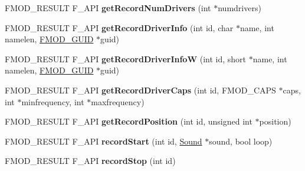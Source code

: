 \begin{DoxyCompactItemize}
\item 
\hypertarget{class_f_m_o_d_1_1_system_a0729c552a7f61ddb37a81feb1469c9e8}{F\-M\-O\-D\-\_\-\-R\-E\-S\-U\-L\-T F\-\_\-\-A\-P\-I {\bfseries get\-Record\-Num\-Drivers} (int $\ast$numdrivers)}\label{class_f_m_o_d_1_1_system_a0729c552a7f61ddb37a81feb1469c9e8}

\item 
\hypertarget{class_f_m_o_d_1_1_system_a7c9feb1180cbafcd4b7295a72b3e56ff}{F\-M\-O\-D\-\_\-\-R\-E\-S\-U\-L\-T F\-\_\-\-A\-P\-I {\bfseries get\-Record\-Driver\-Info} (int id, char $\ast$name, int namelen, \hyperlink{struct_f_m_o_d___g_u_i_d}{F\-M\-O\-D\-\_\-\-G\-U\-I\-D} $\ast$guid)}\label{class_f_m_o_d_1_1_system_a7c9feb1180cbafcd4b7295a72b3e56ff}

\item 
\hypertarget{class_f_m_o_d_1_1_system_a03e2c57a0b01c190e98f92753c606f4a}{F\-M\-O\-D\-\_\-\-R\-E\-S\-U\-L\-T F\-\_\-\-A\-P\-I {\bfseries get\-Record\-Driver\-Info\-W} (int id, short $\ast$name, int namelen, \hyperlink{struct_f_m_o_d___g_u_i_d}{F\-M\-O\-D\-\_\-\-G\-U\-I\-D} $\ast$guid)}\label{class_f_m_o_d_1_1_system_a03e2c57a0b01c190e98f92753c606f4a}

\item 
\hypertarget{class_f_m_o_d_1_1_system_ad5ee4d0a2a2b89ae66d3bbd7255e77a2}{F\-M\-O\-D\-\_\-\-R\-E\-S\-U\-L\-T F\-\_\-\-A\-P\-I {\bfseries get\-Record\-Driver\-Caps} (int id, F\-M\-O\-D\-\_\-\-C\-A\-P\-S $\ast$caps, int $\ast$minfrequency, int $\ast$maxfrequency)}\label{class_f_m_o_d_1_1_system_ad5ee4d0a2a2b89ae66d3bbd7255e77a2}

\item 
\hypertarget{class_f_m_o_d_1_1_system_a508b2368e0c8d9d7d582b89e957c5b5b}{F\-M\-O\-D\-\_\-\-R\-E\-S\-U\-L\-T F\-\_\-\-A\-P\-I {\bfseries get\-Record\-Position} (int id, unsigned int $\ast$position)}\label{class_f_m_o_d_1_1_system_a508b2368e0c8d9d7d582b89e957c5b5b}

\item 
\hypertarget{class_f_m_o_d_1_1_system_a244b4cd7c917fa73354a0b1579003e15}{F\-M\-O\-D\-\_\-\-R\-E\-S\-U\-L\-T F\-\_\-\-A\-P\-I {\bfseries record\-Start} (int id, \hyperlink{class_f_m_o_d_1_1_sound}{Sound} $\ast$sound, bool loop)}\label{class_f_m_o_d_1_1_system_a244b4cd7c917fa73354a0b1579003e15}

\item 
\hypertarget{class_f_m_o_d_1_1_system_a8fb57bf64f8e40ea7e0183cec6765c0f}{F\-M\-O\-D\-\_\-\-R\-E\-S\-U\-L\-T F\-\_\-\-A\-P\-I {\bfseries record\-Stop} (int id)}\label{class_f_m_o_d_1_1_system_a8fb57bf64f8e40ea7e0183cec6765c0f}


\end{DoxyCompactItemize}
